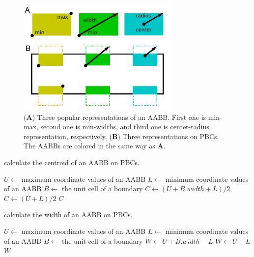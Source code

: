 \documentclass[10pt,letterpaper,twocolumn]{article}
\begin{document}
\begin{figure}[thb]
    \includegraphics[width=8.0cm, bb=2 6 226 165]{fig-rect-rep.eps}
    \caption{
    (\textbf{A})
    Three popular representations of an AABB. First one is min-max,
    second one is min-widths, and third one is center-radius representation,
    respectively.
    (\textbf{B})
    Three representations on PBCs. The AABBs are colored in the same way as
    \textbf{A}.
    }
    \label{fig-rectangle-rep}
\end{figure}

\begin{algorithm}[htb]
    \caption{calculate the centroid of an AABB on PBCs.}
    \label{center_aabb}
    \begin{algorithmic}
        \State $U \gets$ maximum coordinate values of an AABB
        \State $L \gets$ minimum coordinate values of an AABB
        \State $B \gets$ the unit cell of a boundary
                \State $C \gets (U + B.width + L) / 2$
            \Else
                \State $C \gets (U + L) / 2$
            \EndIf
            \State \Return $C$
        \EndFunction
     \end{algorithmic}
\end{algorithm}

\begin{algorithm}[htb]
    \caption{calculate the width of an AABB on PBCs.}
    \label{radius_aabb}
    \begin{algorithmic}
        \State $U \gets$ maximum coordinate values of an AABB
        \State $L \gets$ minimum coordinate values of an AABB
        \State $B \gets$ the unit cell of a boundary
                \State $W \gets U + B.width - L$
            \Else
                \State $W \gets U - L$
            \EndIf
            \State \Return $W$
        \EndFunction
     \end{algorithmic}
\end{algorithm}
\end{document}
